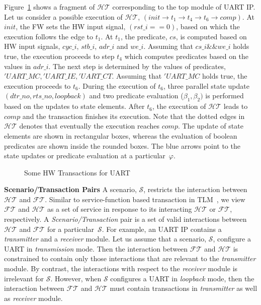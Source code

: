 \documentclass[sigconf]{acmart}
\begin{document}
Figure~\ref{fig:interleaving2} shows a fragment of $\mathcal{HT}$
corresponding to the top module of UART IP.  Let us consider a possible
execution of $\mathcal{HT}$, $(init \rightarrow t_1 \rightarrow t_4
\rightarrow t_6 \rightarrow comp)$.  At $init$, the FW sets the HW input
signal, $(rst\_i==0)$, based on which the execution follows the edge to
$t_1$.  At $t_1$, the predicate, $cs$, is computed based on HW input
signals, $cyc\_i$, $stb\_i$, $adr\_i$ and $we\_i$.  Assuming that $cs\_i
\&\& we\_i$ holds true, the execution proceeds to step $t_4$ which computes
predicates based on the values in $adr\_i$.  The next step is determined by
the values of predicates, $'UART\_MC, 'UART\_IE, 'UART\_CT$.  Assuming that
$'UART\_MC$ holds true, the execution proceeds to $t_6$.  During the
execution of $t_6$, three parallel state update $(dtr\_no, rts\_no,
loopback)$ and two predicate evaluation ($\beta_1,\beta_2)$ is performed
based on the updates to state elements.  After $t_6$, the execution of
$\mathcal{HT}$ leads to $comp$ and the transaction finishes its execution. 
Note that the dotted edges in $\mathcal{HT}$ denotes that eventually the
execution reaches $comp$.  The update of state elements are shown in
rectangular boxes, whereas the evaluation of boolean predicates are shown
inside the rounded boxes.  The blue arrows point to the state updates or
predicate evaluation at a particular~$\varphi$. \\
%
\begin{figure}[t]
\caption{Some HW Transactions for UART
\label{fig:interleaving2}}
\end{figure}
%
\textbf{Scenario/Transaction Pairs}
%
A scenario, $\mathcal{S}$, restricts the interaction between $\mathcal{HT}$
and $\mathcal{FT}$.  Similar to service-function based transaction in
TLM~\cite{hvc}, we view $\mathcal{FT}$ and $\mathcal{HT}$ as a set of
service in response to its interacting $\mathcal{HT}$ or $\mathcal{FT}$,
respectively.  A {\em Scenario/Transaction} pair is a set of valid
interactions between $\mathcal{HT}$ and $\mathcal{FT}$ for a
particular~$\mathcal{S}$.  For example, an UART IP contains a {\em
transmitter} and a {\em receiver} module.  Let us assume that a scenario,
$\mathcal{S}$, configure a UART in {\em transmission} mode.  Then the
interaction between $\mathcal{FT}$ and $\mathcal{HT}$ is constrained to
contain only those interactions that are relevant to the {\em transmitter}
module.  By contrast, the interactions with respect to the {\em receiver}
module is irrelevant for $\mathcal{S}$.  However, when $\mathcal{S}$
configures a UART in {\em loopback} mode, then the interaction between
$\mathcal{FT}$ and $\mathcal{HT}$ must contain transactions in {\em
transmitter} as well as {\em receiver} module.
\end{document}
